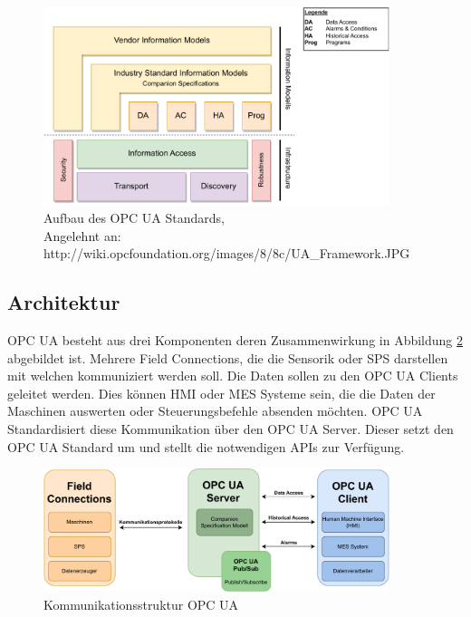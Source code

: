 \documentclass[a4paper, 12pt, oneside]{scrbook}
\begin{document}
		\begin{figure}[h]
			\centering
			\includegraphics[width=0.9\textwidth]{res/diagramms/companionSpezifikations.pdf}
			\caption{Aufbau des OPC UA Standards, \\ Angelehnt an: http://wiki.opcfoundation.org/images/8/8c/UA\_Framework.JPG} %
			\label{fig:OPCUA_Framework}
		\end{figure}
	
		\subsection{Architektur} %
		
		OPC UA besteht aus drei Komponenten deren Zusammenwirkung in Abbildung \ref{fig:OPCUA_Structure} abgebildet ist. Mehrere Field Connections, die die Sensorik oder SPS darstellen mit welchen kommuniziert werden soll. Die Daten sollen zu den OPC UA Clients geleitet werden. Dies können \ac{HMI} oder MES Systeme sein, die die Daten der Maschinen auswerten oder Steuerungsbefehle absenden möchten. OPC UA Standardisiert diese Kommunikation über den OPC UA Server. Dieser setzt den OPC UA Standard um und stellt die notwendigen APIs zur Verfügung.
		
		\begin{figure}[h]
			\centering
			\includegraphics[width=0.9\textwidth]{res/diagramms/OPCUA.pdf}
			\caption{Kommunikationsstruktur OPC UA}
			\label{fig:OPCUA_Structure}
		\end{figure}
		
\end{document}
